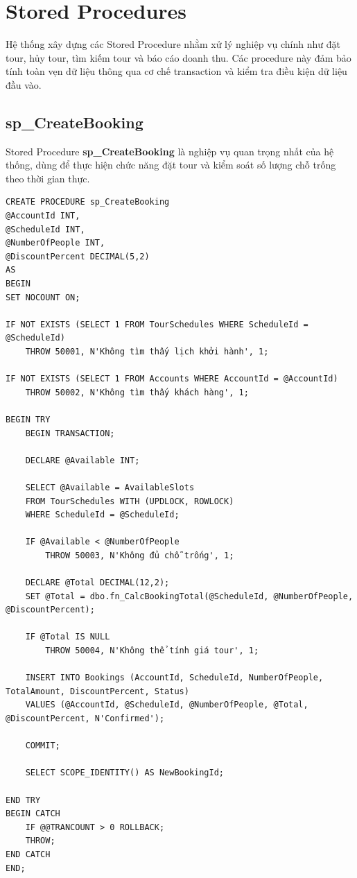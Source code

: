 \section{Stored Procedures}\label{Sec2.6}

Hệ thống xây dựng các Stored Procedure nhằm xử lý nghiệp vụ chính như đặt tour, hủy tour, tìm kiếm tour và báo cáo doanh thu. Các procedure này đảm bảo tính toàn vẹn dữ liệu thông qua cơ chế transaction và kiểm tra điều kiện dữ liệu đầu vào.

\subsection{sp\_CreateBooking}

Stored Procedure \textbf{sp\_CreateBooking} là nghiệp vụ quan trọng nhất của hệ thống, dùng để thực hiện chức năng đặt tour và kiểm soát số lượng chỗ trống theo thời gian thực.

\begin{lstlisting}[style=sql, caption={sp\_CreateBooking}]
CREATE PROCEDURE sp_CreateBooking
@AccountId INT,
@ScheduleId INT,
@NumberOfPeople INT,
@DiscountPercent DECIMAL(5,2)
AS
BEGIN
SET NOCOUNT ON;

IF NOT EXISTS (SELECT 1 FROM TourSchedules WHERE ScheduleId = @ScheduleId)
    THROW 50001, N'Không tìm thấy lịch khởi hành', 1;

IF NOT EXISTS (SELECT 1 FROM Accounts WHERE AccountId = @AccountId)
    THROW 50002, N'Không tìm thấy khách hàng', 1;

BEGIN TRY
    BEGIN TRANSACTION;

    DECLARE @Available INT;

    SELECT @Available = AvailableSlots
    FROM TourSchedules WITH (UPDLOCK, ROWLOCK)
    WHERE ScheduleId = @ScheduleId;

    IF @Available < @NumberOfPeople
        THROW 50003, N'Không đủ chỗ trống', 1;

    DECLARE @Total DECIMAL(12,2);
    SET @Total = dbo.fn_CalcBookingTotal(@ScheduleId, @NumberOfPeople, @DiscountPercent);

    IF @Total IS NULL
        THROW 50004, N'Không thể tính giá tour', 1;

    INSERT INTO Bookings (AccountId, ScheduleId, NumberOfPeople, TotalAmount, DiscountPercent, Status)
    VALUES (@AccountId, @ScheduleId, @NumberOfPeople, @Total, @DiscountPercent, N'Confirmed');

    COMMIT;

    SELECT SCOPE_IDENTITY() AS NewBookingId;

END TRY
BEGIN CATCH
    IF @@TRANCOUNT > 0 ROLLBACK;
    THROW;
END CATCH
END;
\end{lstlisting}

